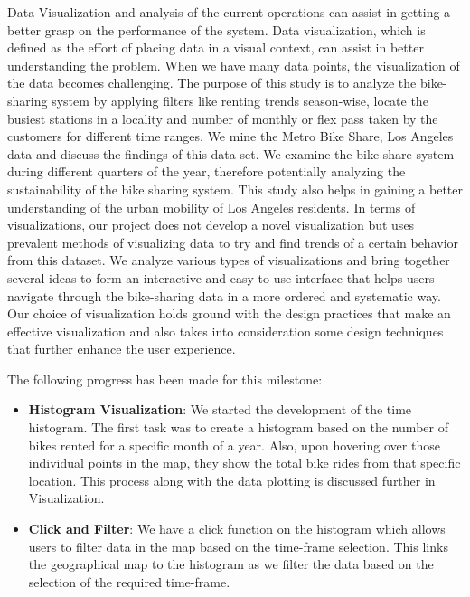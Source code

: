 Data Visualization and analysis of the current operations can assist in getting a better grasp on the performance of the system. Data visualization, which is defined as the effort of placing data in a visual context, can assist in better understanding the problem. When we have many data points, the visualization of the data becomes challenging. The purpose of this study is to analyze the bike-sharing system by applying filters like renting trends season-wise, locate the busiest stations in a locality and number of monthly or flex pass taken by the customers for different time ranges. We mine the Metro Bike Share, Los Angeles data and discuss the findings of this data set. We examine the bike-share system during different quarters of the year, therefore potentially analyzing the sustainability of the bike sharing system. This study also helps in gaining a better understanding of the urban mobility of Los Angeles residents. In terms of visualizations, our project does not develop a novel visualization but uses prevalent methods of visualizing data to try and find trends of a certain behavior from this dataset. We analyze various types of visualizations and bring together several ideas to form an interactive and easy-to-use interface that helps users navigate through the bike-sharing data in a more ordered and systematic way. Our choice of visualization holds ground with the design practices that make an effective visualization and also takes into consideration some design techniques that further enhance the user experience.

The following progress has been made for this milestone:
\begin{itemize}
  \item \textbf{Histogram Visualization}: We started the development of the time histogram. The first task was to create a histogram based on the number of bikes rented for a specific month of a year. Also, upon hovering over those individual points in the map, they show the total bike rides from that specific location. This process along with the data plotting is discussed further in Visualization.
  \item \textbf{Click and Filter}: We have a click function on the histogram which allows users to filter data in the map based on the time-frame selection. This links the geographical map to the histogram as we filter the data based on the selection of the required time-frame. 

\end{itemize}
